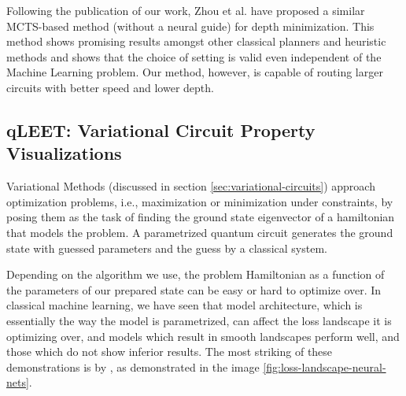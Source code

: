 Following the publication of our work, Zhou et al. \cite{qroute_mcts} have proposed a similar MCTS-based method (without a neural guide) for depth minimization. This method shows promising results amongst other classical planners and heuristic methods and shows that the choice of setting is valid even independent of the Machine Learning problem. Our method, however, is capable of routing larger circuits with better speed and lower depth.

\subsection{qLEET: Variational Circuit Property Visualizations}

Variational Methods (discussed in section \ref{sec:variational-circuits}) approach optimization problems, i.e., maximization or minimization under constraints, by posing them as the task of finding the ground state eigenvector of a hamiltonian that models the problem. A parametrized quantum circuit generates the ground state with guessed parameters and the guess by a classical system.

Depending on the algorithm we use, the problem Hamiltonian as a function of the parameters of our prepared state can be easy or hard to optimize over. In classical machine learning, we have seen that model architecture, which is essentially the way the model is parametrized, can affect the loss landscape it is optimizing over, and models which result in smooth landscapes perform well, and those which do not show inferior results. The most striking of these demonstrations is by \cite{loss-landscapes}, as demonstrated in the image \ref{fig:loss-landscape-neural-nets}. 

